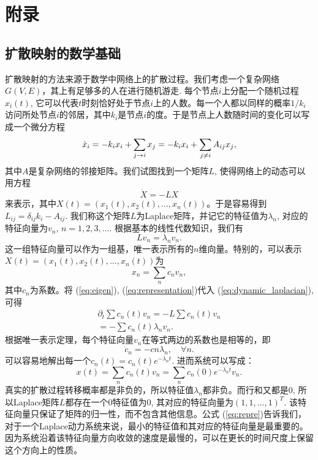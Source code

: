 \chapter*{附录}

\section*{扩散映射的数学基础}

扩散映射的方法来源于数学中网络上的扩散过程。我们考虑一个复杂网络$G(V,E)$，其上有足够多的人在进行随机游走. 每个节点$i$上分配一个随机过程$x_i(t)$, 它可以代表$t$时刻恰好处于节点$i$上的人数。每一个人都以同样的概率$1/k_i$访问所处节点$i$的邻居，其中$k_i$是节点$i$的度。于是节点上人数随时间的变化可以写成一个微分方程\begin{equation}
    \dot{x}_i = -k_i x_i + \sum_{j\to i} x_j \\
    = -k_i x_i +\sum_{j \ne i} A_{ij} x_j,
\end{equation} 其中$A$是复杂网络的邻接矩阵。我们试图找到一个矩阵$L$, 使得网络上的动态可以用方程\begin{equation}
    \dot{X} = - L X
    \label{eq:dynamic_laplacian}
\end{equation}来表示，其中$X(t) = (x_1(t), x_2(t), \dots, x_n(t))$。于是容易得到$L_{ij} = \delta_{ij}k_i - A_{ij}$. 我们称这个矩阵$L$为Laplace矩阵，并记它的特征值为$\lambda_n$, 对应的特征向量为$v_n$, $n = 1,2,3,\dots$. 根据基本的线性代数知识，我们有\begin{equation}
    Lv_n = \lambda_n v_n.
    \label{eq:eigen}
\end{equation} 这一组特征向量可以作为一组基，唯一表示所有的$n$维向量。特别的，可以表示$X(t) = (x_1(t), x_2(t), \dots, x_n(t))$为\begin{equation}
    x_n = \sum_n c_n v_n, 
    \label{eq:representation}
\end{equation}其中$c_n$为系数。将 (\ref{eq:eigen}), (\ref{eq:representation})代入 (\ref{eq:dynamic_laplacian}), 可得\begin{align}
        \partial_t \sum c_n(t)v_n = -L\sum c_n(t) v_n\\
        = -\sum c_n(t)\lambda_n v_n.
\end{align}根据唯一表示定理，每个特征向量$v_n$在等式两边的系数也是相等的，即\begin{equation}
    \dot{c}_n = -cn\lambda_n,\quad \forall n.
\end{equation}可以容易地解出每一个$c_n(t) = c_n(t) e^{-\lambda_n t}$. 进而系统可以写成：\begin{equation}
    x(t) = \sum_n c_n(t) v_n = \sum_n c_n(0)e^{-\lambda_n t} v_n. 
    \label{eq:repre}
\end{equation}真实的扩散过程转移概率都是非负的，所以特征值$\lambda_{n}$都非负。而行和又都是$0$, 所以Laplace矩阵$L$都存在一个$0$特征值为$0$, 其对应的特征向量为$(1,1,\dots, 1)^{T}$. 该特征向量只保证了矩阵的归一性，而不包含其他信息。公式 (\ref{eq:repre})告诉我们，对于一个Laplace动力系统来说，最小的特征值和其对应的特征向量是最重要的。因为系统沿着该特征向量方向收敛的速度是最慢的，可以在更长的时间尺度上保留这个方向上的性质。